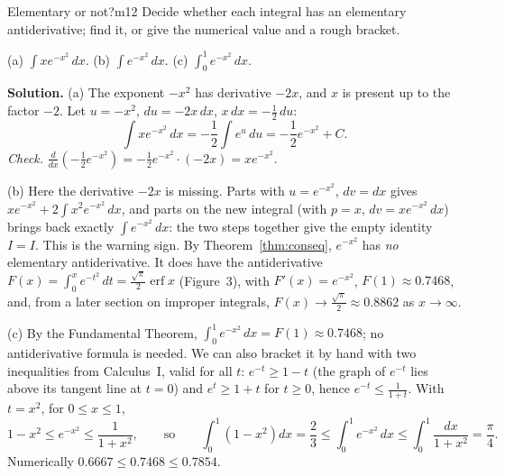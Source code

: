\documentclass[11pt]{article}
\begin{document}
\begin{exmp}{Elementary or not?}{m12}
Decide whether each integral has an elementary antiderivative; find it, or give the numerical value and a rough bracket.

(a) $\displaystyle\int xe^{-x^2}\,dx$. \quad (b) $\displaystyle\int e^{-x^2}\,dx$. \quad (c) $\displaystyle\int_0^1e^{-x^2}\,dx$.

\textbf{Solution.} (a) The exponent $-x^2$ has derivative $-2x$, and $x$ is present up to the factor $-2$. Let $u=-x^2$, $du=-2x\,dx$, $x\,dx=-\frac12\,du$:
\[\int xe^{-x^2}\,dx=-\frac12\int e^u\,du=-\frac12e^{-x^2}+C .\]
\emph{Check.} $\frac d{dx}\left(-\frac12e^{-x^2}\right)=-\frac12e^{-x^2}\cdot(-2x)=xe^{-x^2}$.

(b) Here the derivative $-2x$ is missing. Parts with $u=e^{-x^2}$, $dv=dx$ gives $xe^{-x^2}+2\int x^2e^{-x^2}\,dx$, and parts on the new integral (with $p=x$, $dv=xe^{-x^2}\,dx$) brings back exactly $\int e^{-x^2}\,dx$: the two steps together give the empty identity $I=I$. This is the warning sign. By Theorem~\ref{thm:conseq}, $e^{-x^2}$ has \emph{no} elementary antiderivative. It does have the antiderivative $F(x)=\int_0^xe^{-t^2}\,dt=\frac{\sqrt\pi}2\operatorname{erf}x$ (Figure~3), with $F'(x)=e^{-x^2}$, $F(1)\approx0.7468$, and, from a later section on improper integrals, $F(x)\to\frac{\sqrt\pi}2\approx0.8862$ as $x\to\infty$.

(c) By the Fundamental Theorem, $\int_0^1e^{-x^2}\,dx=F(1)\approx0.7468$; no antiderivative formula is needed. We can also bracket it by hand with two inequalities from Calculus~I, valid for all $t$: $e^{-t}\ge1-t$ (the graph of $e^{-t}$ lies above its tangent line at $t=0$) and $e^t\ge1+t$ for $t\ge0$, hence $e^{-t}\le\frac1{1+t}$. With $t=x^2$, for $0\le x\le1$,
\[1-x^2\le e^{-x^2}\le\frac1{1+x^2},\qquad\text{so}\qquad\int_0^1\left(1-x^2\right)dx=\frac23\le\int_0^1e^{-x^2}\,dx\le\int_0^1\frac{dx}{1+x^2}=\frac\pi4 .\]
Numerically $0.6667\le0.7468\le0.7854$.


\end{exmp}
\end{document}
